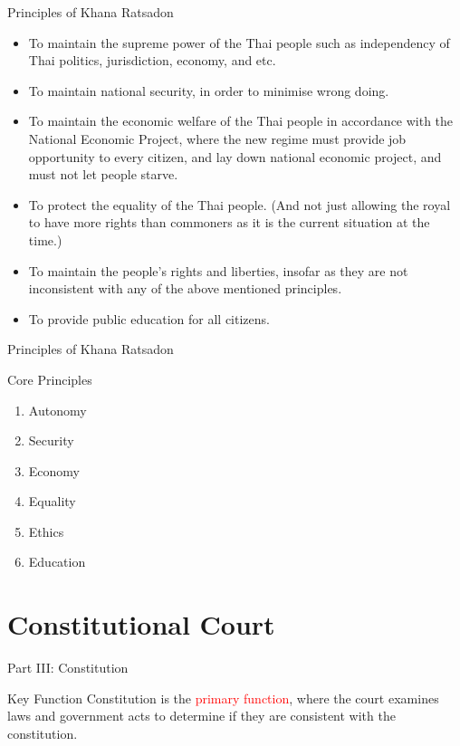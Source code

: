 \documentclass[aspectratio=169]{beamer}
\begin{document}
\begin{frame}{Principles of Khana Ratsadon}
		\begin{itemize}[<+->]
			\item To maintain the supreme power of the Thai people such as independency of Thai politics, jurisdiction, economy, and etc.
			\item To maintain national security, in order to minimise wrong doing.
			\item To maintain the economic welfare of the Thai people in accordance with the National Economic Project, where the new regime must provide job opportunity to every citizen, and lay down national economic project, and must not let people starve.
			\item To protect the equality of the Thai people. (And not just allowing the royal to have more rights than commoners as it is the current situation at the time.)
			\item To maintain the people's rights and liberties, insofar as they are not inconsistent with any of the above mentioned principles.
			\item To provide public education for all citizens.
		\end{itemize}
\end{frame}

\begin{frame}{Principles of Khana Ratsadon}
	\begin{block}{Core Principles}
		\begin{enumerate}
			\item Autonomy
			\item Security
			\item Economy
			\item Equality
			\item Ethics
			\item Education
		\end{enumerate}
	\end{block}
\end{frame}

\section{Constitutional Court}

\begin{frame}{Part III: Constitution}
	\begin{block}{Key Function}
		Constitution is the \textcolor{red}{primary function}, where the court examines laws and government
acts to determine if they are consistent with the constitution.
	\end{block}	
\end{frame}
\end{document}
